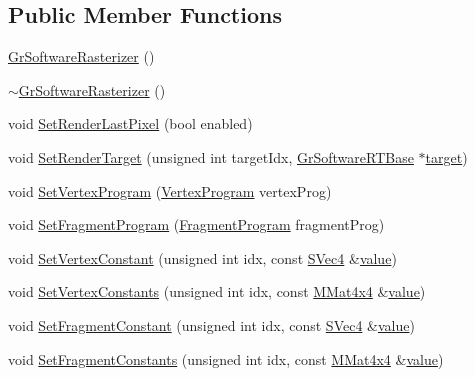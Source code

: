 \begin{CompactItemize}
\subsection*{Public Member Functions}
\begin{CompactItemize}
\item 
\hyperlink{class_gr_software_rasterizer_4152bc0ee54f65d67451793cace04326}{GrSoftwareRasterizer} ()
\item 
\hyperlink{class_gr_software_rasterizer_374f835befa73886edbfa0888635f636}{$\sim$GrSoftwareRasterizer} ()
\item 
void \hyperlink{class_gr_software_rasterizer_e00f004845e02489d39864fbfb306435}{SetRenderLastPixel} (bool enabled)
\item 
void \hyperlink{class_gr_software_rasterizer_a5d85f57b17b61072eaf05f6f6d56f98}{SetRenderTarget} (unsigned int targetIdx, \hyperlink{class_gr_software_r_t_base}{GrSoftwareRTBase} $\ast$\hyperlink{glext_8h_f9d0cbbbeb7414e786c41899e5a856d7}{target})
\item 
void \hyperlink{class_gr_software_rasterizer_2a56d53611c7f50e13de3fdbd3b6c0a3}{SetVertexProgram} (\hyperlink{class_gr_software_rasterizer_04030d2fb613d917866570b1150e208b}{VertexProgram} vertexProg)
\item 
void \hyperlink{class_gr_software_rasterizer_660384a042b72d1f2e1235a938acc23b}{SetFragmentProgram} (\hyperlink{class_gr_software_rasterizer_391d569a4a93dabc37cdc787f11c2e9a}{FragmentProgram} fragmentProg)
\item 
void \hyperlink{class_gr_software_rasterizer_0c67a108c361c1b57fd133e2a2b2819f}{SetVertexConstant} (unsigned int idx, const \hyperlink{struct_s_vec4}{SVec4} \&\hyperlink{glext__bak_8h_6a4f8a1a444e9080b297963b3db29fe0}{value})
\item 
void \hyperlink{class_gr_software_rasterizer_ce6f2dcf3bffc89ecbfb4b12a185f06d}{SetVertexConstants} (unsigned int idx, const \hyperlink{class_m_mat4x4}{MMat4x4} \&\hyperlink{glext__bak_8h_6a4f8a1a444e9080b297963b3db29fe0}{value})
\item 
void \hyperlink{class_gr_software_rasterizer_cddd37af11129fa007df31f439e683cc}{SetFragmentConstant} (unsigned int idx, const \hyperlink{struct_s_vec4}{SVec4} \&\hyperlink{glext__bak_8h_6a4f8a1a444e9080b297963b3db29fe0}{value})
\item 
void \hyperlink{class_gr_software_rasterizer_1ed18c92ae0225a77954ec6371b74401}{SetFragmentConstants} (unsigned int idx, const \hyperlink{class_m_mat4x4}{MMat4x4} \&\hyperlink{glext__bak_8h_6a4f8a1a444e9080b297963b3db29fe0}{value})

\end{CompactItemize}
\end{CompactItemize}
